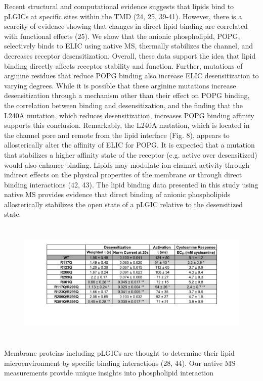 Recent structural and computational evidence suggests that lipids bind
to pLGICs at specific sites within the TMD (24, 25, 39-41). However,
there is a scarcity of evidence showing that changes in direct lipid
binding are correlated with functional effects (25). We show that the
anionic phospholipid, POPG, selectively binds to ELIC using native MS,
thermally stabilizes the channel, and decreases receptor
desensitization. Overall, these data support the idea that lipid binding
directly affects receptor stability and function. Further, mutations of
arginine residues that reduce POPG binding also increase ELIC
desensitization to varying degrees. While it is possible that these
arginine mutations increase desensitization through a mechanism other
than their effect on POPG binding, the correlation between binding and
desensitization, and the finding that the L240A mutation, which reduces
desensitization, increases POPG binding affinity supports this
conclusion. Remarkably, the L240A mutation, which is located in the
channel pore and remote from the lipid interface (Fig. 8), appears to
allosterically alter the affinity of ELIC for POPG. It is expected that
a mutation that stabilizes a higher affinity state of the receptor (e.g.
active over desensitized) would also enhance binding. Lipids may
modulate ion channel activity through indirect effects on the physical
properties of the membrane or through direct binding interactions (42,
43). The lipid binding data presented in this study using native MS
provides evidence that direct binding of anionic phospholipids
allosterically stabilizes the open state of a pLGIC relative to the
desensitized state.
\begin{figure}
\includegraphics[width=6.43125in,height=2.31635in]{./pandoc_test/media/image8.pdf}
\end{figure}
Membrane proteins including pLGICs are thought to determine their lipid
microenvironment by specific binding interactions (28, 44). Our native
MS measurements provide unique insights into phospholipid interaction
